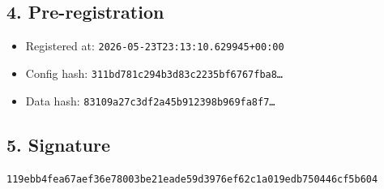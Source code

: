 \documentclass{article}
\begin{document}
\subsection*{4. Pre-registration}
\begin{itemize}
\item Registered at: \texttt{2026-05-23T23:13:10.629945+00:00}
\item Config hash: \texttt{311bd781c294b3d83c2235bf6767fba8\dots}
\item Data hash: \texttt{83109a27c3df2a45b912398b969fa8f7\dots}
\end{itemize}
\subsection*{5. Signature}
\texttt{119ebb4fea67aef36e78003be21eade59d3976ef62c1a019edb750446cf5b604}\\
\end{document}
